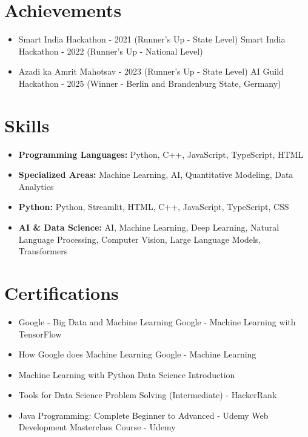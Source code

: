 \documentclass[a4paper,10pt]{article}
\begin{document}
\section*{Achievements}
\begin{itemize}
\item Smart India Hackathon - 2021 (Runner's Up - State Level) \hfill Smart India Hackathon - 2022 (Runner's Up - National Level)
\item Azadi ka Amrit Mahotsav - 2023 (Runner's Up - State Level) \hfill AI Guild Hackathon - 2025 (Winner - Berlin and Brandenburg State, Germany)
\end{itemize}

\section*{Skills}
\begin{itemize}
  \item \textbf{Programming Languages:} Python, C++, JavaScript, TypeScript, HTML
  \item \textbf{Specialized Areas:} Machine Learning, AI, Quantitative Modeling, Data Analytics
  \item \textbf{Python:} Python, Streamlit, HTML, C++, JavaScript, TypeScript, CSS
  \item \textbf{AI \& Data Science:} AI, Machine Learning, Deep Learning, Natural Language Processing, Computer Vision, Large Language Models, Transformers
\end{itemize}

\section*{Certifications}
\begin{itemize}
\item Google - Big Data and Machine Learning \hfill Google - Machine Learning with TensorFlow
\item How Google does Machine Learning \hfill Google - Machine Learning
\item Machine Learning with Python \hfill Data Science Introduction
\item Tools for Data Science \hfill Problem Solving (Intermediate) - HackerRank
\item Java Programming: Complete Beginner to Advanced - Udemy \hfill Web Development Masterclass Course - Udemy
\end{itemize}
\end{document}
